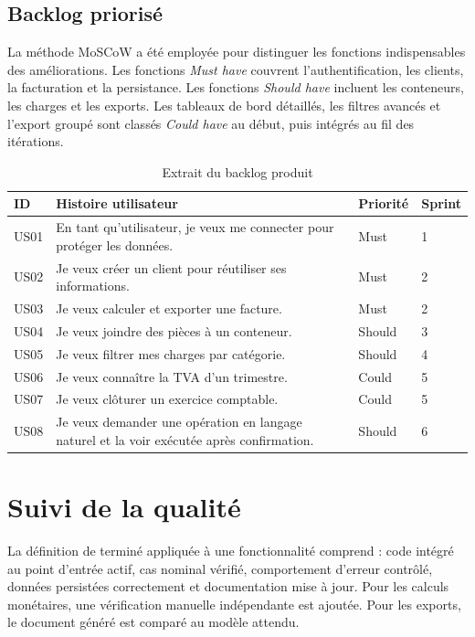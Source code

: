 \documentclass[12pt,a4paper,oneside]{report}
\begin{document}
\subsection{Backlog priorisé}
La méthode MoSCoW a été employée pour distinguer les fonctions indispensables des améliorations. Les fonctions \emph{Must have} couvrent l'authentification, les clients, la facturation et la persistance. Les fonctions \emph{Should have} incluent les conteneurs, les charges et les exports. Les tableaux de bord détaillés, les filtres avancés et l'export groupé sont classés \emph{Could have} au début, puis intégrés au fil des itérations.

\begin{table}[H]\centering
\caption{Extrait du backlog produit}
\begin{tabularx}{\textwidth}{p{1.5cm}Y p{2.5cm}p{2cm}}
\toprule \textbf{ID} & \textbf{Histoire utilisateur} & \textbf{Priorité} & \textbf{Sprint}\\ \midrule
US01 & En tant qu'utilisateur, je veux me connecter pour protéger les données. & Must & 1\\
US02 & Je veux créer un client pour réutiliser ses informations. & Must & 2\\
US03 & Je veux calculer et exporter une facture. & Must & 2\\
US04 & Je veux joindre des pièces à un conteneur. & Should & 3\\
US05 & Je veux filtrer mes charges par catégorie. & Should & 4\\
US06 & Je veux connaître la TVA d'un trimestre. & Could & 5\\
US07 & Je veux clôturer un exercice comptable. & Could & 5\\
US08 & Je veux demander une opération en langage naturel et la voir exécutée après confirmation. & Should & 6\\
\bottomrule
\end{tabularx}
\end{table}

\section{Suivi de la qualité}
La définition de terminé appliquée à une fonctionnalité comprend : code intégré au point d'entrée actif, cas nominal vérifié, comportement d'erreur contrôlé, données persistées correctement et documentation mise à jour. Pour les calculs monétaires, une vérification manuelle indépendante est ajoutée. Pour les exports, le document généré est comparé au modèle attendu.
\end{document}
